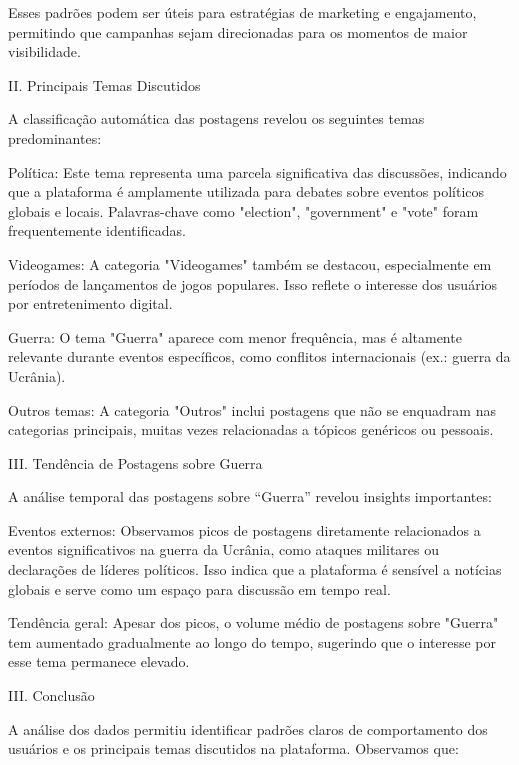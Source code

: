\documentclass[
  letterpaper,
  DIV=11,
  numbers=noendperiod]{scrartcl}
\begin{document}
Esses padrões podem ser úteis para estratégias de marketing e
engajamento, permitindo que campanhas sejam direcionadas para os
momentos de maior visibilidade.

  II. Principais Temas Discutidos

A classificação automática das postagens revelou os seguintes temas
predominantes:

\begin{VerbatimWithBreaks}
Política:  Este tema representa uma parcela significativa das discussões, indicando que a plataforma é amplamente utilizada para debates sobre eventos políticos globais e locais. Palavras-chave como "election", "government" e "vote" foram frequentemente identificadas. 

Videogames:  A categoria "Videogames" também se destacou, especialmente em períodos de lançamentos de jogos populares. Isso reflete o interesse dos usuários por entretenimento digital. 

Guerra:  O tema "Guerra" aparece com menor frequência, mas é altamente relevante durante eventos específicos, como conflitos internacionais (ex.: guerra da Ucrânia). 

Outros temas:  A categoria "Outros" inclui postagens que não se enquadram nas categorias principais, muitas vezes relacionadas a tópicos genéricos ou pessoais. 
 
\end{VerbatimWithBreaks}

  III. Tendência de Postagens sobre Guerra

A análise temporal das postagens sobre ``Guerra'' revelou insights
importantes:

\begin{VerbatimWithBreaks}
Eventos externos:  Observamos picos de postagens diretamente relacionados a eventos significativos na guerra da Ucrânia, como ataques militares ou declarações de líderes políticos. Isso indica que a plataforma é sensível a notícias globais e serve como um espaço para discussão em tempo real. 

Tendência geral:  Apesar dos picos, o volume médio de postagens sobre "Guerra" tem aumentado gradualmente ao longo do tempo, sugerindo que o interesse por esse tema permanece elevado. 
 
\end{VerbatimWithBreaks}

  III. Conclusão

A análise dos dados permitiu identificar padrões claros de comportamento
dos usuários e os principais temas discutidos na plataforma. Observamos
que:
\end{document}
